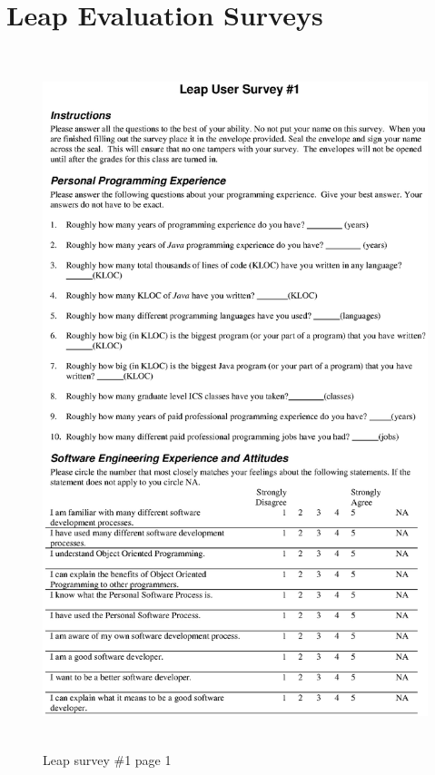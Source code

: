 
\chapter{Leap Evaluation Surveys}
\label{sec:questionnaires} 

\begin{figure}[htbp]
  \centering
  \includegraphics[height=8in]{sur1p1.eps}
  \caption{Leap survey \#1 page 1}
  \label{fig:survey1.1}
\end{figure}

